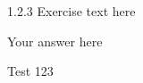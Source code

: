 \documentclass{rutgers_hw}
\author{Firstname Lastname} %
\date{\today} %
\begin{document}
\maketitle



\begin{exercise}{1.2.3}
  Exercise text here
\end{exercise}
\begin{solution}
  Your answer here
\end{solution}

\newpage

\begin{exercise}{2}
  Test 123
\end{exercise}
\end{document}
